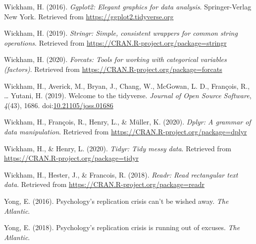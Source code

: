 \documentclass[
  man,mask,floatsintext]{apa6}
\newlength{\cslhangindent}
\newenvironment{cslreferences}%
  {\setlength{\parindent}{0pt}%
  \everypar{\setlength{\hangindent}{\cslhangindent}}\ignorespaces}%
  {\par}
\begin{document}
\begin{cslreferences}
\leavevmode\hypertarget{ref-R-ggplot2}{}%
Wickham, H. (2016). \emph{Ggplot2: Elegant graphics for data analysis}. Springer-Verlag New York. Retrieved from \url{https://ggplot2.tidyverse.org}

\leavevmode\hypertarget{ref-R-stringr}{}%
Wickham, H. (2019). \emph{Stringr: Simple, consistent wrappers for common string operations}. Retrieved from \url{https://CRAN.R-project.org/package=stringr}

\leavevmode\hypertarget{ref-R-forcats}{}%
Wickham, H. (2020). \emph{Forcats: Tools for working with categorical variables (factors)}. Retrieved from \url{https://CRAN.R-project.org/package=forcats}

\leavevmode\hypertarget{ref-R-tidyverse}{}%
Wickham, H., Averick, M., Bryan, J., Chang, W., McGowan, L. D., François, R., \ldots{} Yutani, H. (2019). Welcome to the tidyverse. \emph{Journal of Open Source Software}, \emph{4}(43), 1686. doi:\href{https://doi.org/10.21105/joss.01686}{10.21105/joss.01686}

\leavevmode\hypertarget{ref-R-dplyr}{}%
Wickham, H., François, R., Henry, L., \& Müller, K. (2020). \emph{Dplyr: A grammar of data manipulation}. Retrieved from \url{https://CRAN.R-project.org/package=dplyr}

\leavevmode\hypertarget{ref-R-tidyr}{}%
Wickham, H., \& Henry, L. (2020). \emph{Tidyr: Tidy messy data}. Retrieved from \url{https://CRAN.R-project.org/package=tidyr}

\leavevmode\hypertarget{ref-R-readr}{}%
Wickham, H., Hester, J., \& Francois, R. (2018). \emph{Readr: Read rectangular text data}. Retrieved from \url{https://CRAN.R-project.org/package=readr}

\leavevmode\hypertarget{ref-yongPsychologyReplicationCrisis2016}{}%
Yong, E. (2016). Psychology's replication crisis can't be wished away. \emph{The Atlantic}.

\leavevmode\hypertarget{ref-yongPsychologyReplicationCrisis2018}{}%
Yong, E. (2018). Psychology's replication crisis is running out of excuses. \emph{The Atlantic}.
\end{cslreferences}

\endgroup
\end{document}
